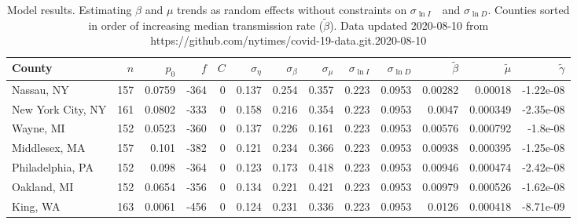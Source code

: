 \documentclass[12pt,letterpaper]{article}
\newcommand\slI{$\sigma_{\ln I}$\ }
\newcommand\slD{$\sigma_{\ln D}$}
\begin{document}
\begin{appendices}
\begin{sidewaystable}
{%
}\end{sidewaystable}
\clearpage


\begin{sidewaystable}
\caption{\label{tab:uncons}
Model results. Estimating $\beta$ and $\mu$ trends as random effects
without constraints on  \slI\ and \slD. 
Counties sorted in order of increasing median transmission rate ($\tilde\beta$).
Data updated 2020-08-10 from https://github.com/nytimes/covid-19-data.git.2020-08-10
}
\centering
{\scriptsize

\begin{tabular}{lrrrrrrrrrrrr}
\hline
 County             &   $n$ &   $p_0$ &    $f$ &   $C$ &   $\sigma_\eta$ &   $\sigma_\beta$ &   $\sigma_\mu$ &   $\sigma_{\ln I}$ &   $\sigma_{\ln D}$ &   $\tilde{\beta}$ &   $\tilde{\mu}$ &   $\tilde\gamma$ \\
\hline
 Nassau, NY         & 157   & 0.0759  & -364   &     0 &          0.137  &           0.254  &         0.357  &              0.223 &             0.0953 &           0.00282 &        0.00018  &       -1.22e-08  \\
 New York City, NY  & 161   & 0.0802  & -333   &     0 &          0.158  &           0.216  &         0.354  &              0.223 &             0.0953 &           0.0047  &        0.000349 &       -2.35e-08  \\
 Wayne, MI          & 152   & 0.0523  & -360   &     0 &          0.137  &           0.226  &         0.161  &              0.223 &             0.0953 &           0.00576 &        0.000792 &       -1.8e-08   \\
 Middlesex, MA      & 157   & 0.101   & -382   &     0 &          0.121  &           0.234  &         0.366  &              0.223 &             0.0953 &           0.00938 &        0.000395 &       -1.25e-08  \\
 Philadelphia, PA   & 152   & 0.098   & -364   &     0 &          0.123  &           0.173  &         0.418  &              0.223 &             0.0953 &           0.00946 &        0.000474 &       -2.42e-08  \\
 Oakland, MI        & 152   & 0.0654  & -356   &     0 &          0.134  &           0.221  &         0.421  &              0.223 &             0.0953 &           0.00979 &        0.000526 &       -1.62e-08  \\
 King, WA           & 163   & 0.0061  & -456   &     0 &          0.124  &           0.231  &         0.336  &              0.223 &             0.0953 &           0.0126  &        0.000418 &       -8.71e-09  \\

\end{tabular}}
\end{sidewaystable}
\end{appendices}
\end{document}
